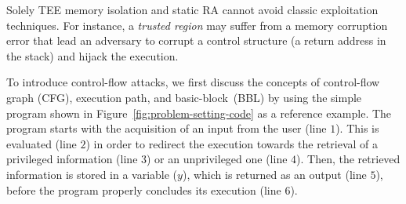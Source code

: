 Solely TEE memory isolation and static RA cannot avoid classic exploitation 
techniques.
For instance, a \emph{trusted region} may suffer from a memory corruption 
error that lead an adversary to corrupt a control structure (\ie a return 
address in the stack) and hijack the execution.

To introduce control-flow attacks, we first discuss the concepts of 
control-flow graph (CFG), execution path, and basic-block~(BBL) by using the 
simple program shown in Figure~\ref{fig:problem-setting-code} as a reference 
example. 
The program starts with the acquisition of an input from the user (line $1$). 
This is evaluated (line $2$) in order to redirect the execution towards the 
retrieval of a privileged information (line $3$) or an unprivileged one (line 
$4$). Then, the retrieved information is stored in a variable ($y$), which is 
returned as an output (line $5$), before the program properly concludes its 
execution (line $6$). 

